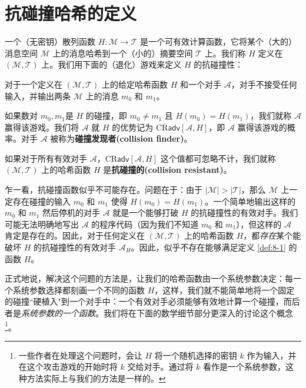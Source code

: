 \section{抗碰撞哈希的定义}\label{sec:8-1}

一个（无密钥）散列函数 $H:\mathcal{M}\to\mathcal{T}$ 是一个可有效计算函数，它将某个（大的）消息空间 $\mathcal{M}$ 上的消息哈希到一个（小的）摘要空间 $\mathcal{T}$ 上。我们称 $H$ 定义在 $(\mathcal{M},\mathcal{T})$ 上。我们用下面的（退化）游戏来定义 $H$ 的抗碰撞性：
\begin{game}[抗碰撞性]\label{game:8-1}
对于一个定义在 $(\mathcal{M},\mathcal{T})$ 上的给定哈希函数 $H$ 和一个对手 $\mathcal{A}$，对手不接受任何输入，并输出两条 $\mathcal{M}$ 上的消息 $m_0$ 和 $m_1$。

如果数对 $m_0, m_1$是 $H$ 的碰撞，即 $m_0\neq m_1$ 且 $H(m_0)=H(m_1)$，我们就称 $\mathcal{A}$ 赢得该游戏。我们将 $\mathcal{A}$ 就 $H$ 的优势记为 $\mathrm{CR}\mathsf{adv}[\mathcal{A},H]$，即 $\mathcal{A}$ 赢得该游戏的概率。对手 $\mathcal{A}$ 被称为\textbf{碰撞发现者(collision finder)}。
\end{game}

\begin{definition}\label{def:8-1}
如果对于所有有效对手 $\mathcal{A}$，$\mathrm{CR}\mathsf{adv}[\mathcal{A},H]$ 这个值都可忽略不计，我们就称 $(\mathcal{M},\mathcal{T})$ 上的哈希函数 $H$ 是\textbf{抗碰撞的(collision resistant)}。
\end{definition}

乍一看，抗碰撞函数似乎不可能存在。问题在于：由于 $|\mathcal{M}|>|\mathcal{T}|$，那么 $\mathcal{M}$ 上一定存在碰撞的输入 $m_0$ 和 $m_1$ 使得 $H(m_0)=H(m_1)$。一个简单地输出这样的 $m_0$ 和 $m_1$ 然后停机的对手 $\mathcal{A}$ 就是一个能够打破 $H$ 的抗碰撞性的有效对手。我们可能无法明确地写出 $\mathcal{A}$ 的程序代码（因为我们不知道 $m_0$ 和 $m_1$），但这样的 $\mathcal{A}$ 肯定是存在的。因此，对于任何定义在 $(\mathcal{M},\mathcal{T})$ 上的哈希函数 $H$，都\emph{存在}某个能破坏 $H$ 的抗碰撞性的有效对手 $\mathcal{A}_H$。因此，似乎不存在能够满足定义 \ref{def:8-1} 的函数 $H$。

正式地说，解决这个问题的方法是，让我们的哈希函数由一个系统参数决定：每一个系统参数选择都刻画一个不同的函数 $H$，这样，我们就不能简单地将一个固定的碰撞``硬植入"到一个对手中：一个有效对手必须能够有效地计算一个碰撞，而后者是\emph{系统参数的一个函数}。我们将在下面的数学细节部分更深入的讨论这个概念\footnote{一些作者在处理这个问题时，会让 $H$ 将一个随机选择的密钥 $k$ 作为输入，并在这个攻击游戏的开始时将 $k$ 交给对手。通过将 $k$ 看作是一个系统参数，这种方法实际上与我们的方法是一样的。}。

